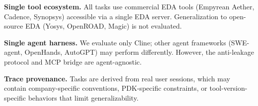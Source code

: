 \textbf{Single tool ecosystem.} All tasks use commercial EDA tools (Empyrean Aether, Cadence, Synopsys) accessible via a single EDA server. Generalization to open-source EDA (Yosys, OpenROAD, Magic) is not evaluated.

\textbf{Single agent harness.} We evaluate only Cline; other agent frameworks (SWE-agent, OpenHands, AutoGPT) may perform differently. However, the anti-leakage protocol and MCP bridge are agent-agnostic.

\textbf{Trace provenance.} Tasks are derived from real user sessions, which may contain company-specific conventions, PDK-specific constraints, or tool-version-specific behaviors that limit generalizability.
